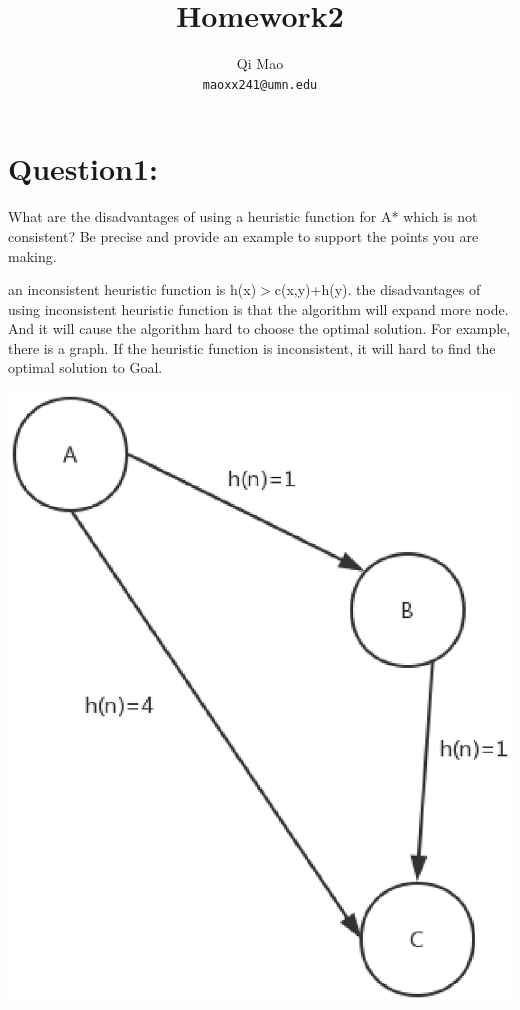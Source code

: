 \documentclass{article}
\begin{document}
\title{Homework2}
\author{Qi Mao\\
  \texttt{maoxx241@umn.edu}}
\maketitle


\section{Question1:}
What are the disadvantages of using a heuristic function for A* which is not consistent? Be precise and provide an example to support the points you are making. 
\break

an inconsistent heuristic function is h(x)$>$c(x,y)+h(y). the disadvantages of using inconsistent heuristic function is that the algorithm
will expand more node. And it will cause the algorithm hard to choose the optimal
solution.\newline
For example, there is a graph. If the heuristic function is inconsistent, it will hard to find the optimal solution to Goal.
\begin{center}
    \includegraphics[scale=0.5]{2}
\end{center}
\end{document}
